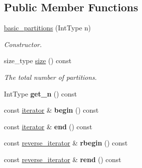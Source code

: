 \subsection*{Public Member Functions}
\begin{DoxyCompactItemize}
\item 
\hyperlink{classdscr_1_1basic__partitions_aa1bdcf6666b8b022a10c802aaeb4e71a}{basic\-\_\-partitions} (Int\-Type n)
\begin{DoxyCompactList}\small\item\em Constructor. \end{DoxyCompactList}\item 
size\-\_\-type \hyperlink{classdscr_1_1basic__partitions_a3704e667fcafed71d91a75012183f6dc}{size} () const 
\begin{DoxyCompactList}\small\item\em The total number of partitions. \end{DoxyCompactList}\item 
\hypertarget{classdscr_1_1basic__partitions_a16ad5a5a3befa80b635a3d3572619cd4}{Int\-Type {\bfseries get\-\_\-n} () const }\label{classdscr_1_1basic__partitions_a16ad5a5a3befa80b635a3d3572619cd4}

\item 
\hypertarget{classdscr_1_1basic__partitions_ab28b04cb9c2905c1de921a51f1d427b3}{const \hyperlink{classdscr_1_1basic__partitions_1_1iterator}{iterator} \& {\bfseries begin} () const }\label{classdscr_1_1basic__partitions_ab28b04cb9c2905c1de921a51f1d427b3}

\item 
\hypertarget{classdscr_1_1basic__partitions_a8e5a436ba43707b0b269df0d264f8a81}{const \hyperlink{classdscr_1_1basic__partitions_1_1iterator}{iterator} \& {\bfseries end} () const }\label{classdscr_1_1basic__partitions_a8e5a436ba43707b0b269df0d264f8a81}

\item 
\hypertarget{classdscr_1_1basic__partitions_ac493587418c428f935b9ce33f5894536}{const \hyperlink{classdscr_1_1basic__partitions_1_1reverse__iterator}{reverse\-\_\-iterator} \& {\bfseries rbegin} () const }\label{classdscr_1_1basic__partitions_ac493587418c428f935b9ce33f5894536}

\item 
\hypertarget{classdscr_1_1basic__partitions_ac6d96b6e04827561635b8ac9c5339843}{const \hyperlink{classdscr_1_1basic__partitions_1_1reverse__iterator}{reverse\-\_\-iterator} \& {\bfseries rend} () const }\label{classdscr_1_1basic__partitions_ac6d96b6e04827561635b8ac9c5339843}

\end{DoxyCompactItemize}
